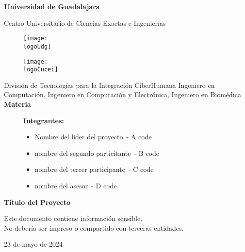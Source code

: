 \documentclass[10pt,twocolumn,letterpaper]{article}
\date{}
\title{\fontsize{24}{28.8}\selectfont \theTitle}
\author{\theAuthor}
\author{\bAuthor}
\affil{\small
	\textit{CENTRO UNIVERSITARIO DE CIENCIAS}\\
	\textit{EXACTAS E INGENIERÍAS, (CUCEI, UDG)}
}
\affil{
	\fontfamily{pcr}\selectfont
	\theAuthorMail\\
	\fontfamily{pcr}\selectfont
	\cAuthorMail\\
	\fontfamily{pcr}\selectfont
	\bAuthorMail\\
	\fontfamily{pcr}\selectfont
	\dAuthorMail
	\vspace*{-8pt}
}
\newcommand{\logoUdg}{logo-udg.jpg}
\newcommand{\logoCucei}{logo-cucei.jpg}
\newcommand{\universidad}{Universidad de Guadalajara}
\newcommand{\cede}{Centro Universitario de Ciencias Exactas e Ingenierías}
\newcommand{\materia}{Materia}
\newcommand{\division}{División de Tecnologías para la Integración CiberHumana}
\newcommand{\theTitle}{Título del Proyecto}
\newcommand{\startDate}{23 de mayo de 2024}
\newcommand{\theAuthor}{Nombre del líder del proyecto}
\newcommand{\bAuthor}{nombre del segundo particitante}
\newcommand{\cAuthor}{nombre del tercer participante}
\newcommand{\dAuthor}{nombre del asesor}
\newcommand{\theAuthorCode}{A code}
\newcommand{\bAuthorCode}{B code}
\newcommand{\cAuthorCode}{C code}
\newcommand{\dAuthorCode}{D code}
\newcommand{\aTitutlo}{Ingeniero en Computación}
\newcommand{\btitulo}{Ingeniero en Computación y Electrónica}
\newcommand{\cTitulo}{Ingeniero en Biomédica}
\begin{document}
\begin{titlepage}
	\centering
	{\huge\textbf{\universidad}}\par\vspace{0.6cm}
	{\LARGE{\cede}}\vfill
	
	\begin{figure}[h]
		\begin{minipage}[t]{0.45\textwidth}
			\centering
			\texttt{[image: \\logoUdg]}
		\end{minipage}
		\hfill
		\begin{minipage}[t]{0.45\textwidth}
			\centering
			\texttt{[image: \\logoCucei]}
		\end{minipage}
	\end{figure}\vfill
	
	\Large{
		\division\vfill
		\aTitutlo, \btitulo, \cTitulo\vfill
		\textbf{\materia}\vfill
	}

	\begin{figure}[h]
		\centering
		\begin{minipage}[t]{0.75\textwidth}
			{\Large
				\textbf{Integrantes:}
				\begin{itemize}
					\item \theAuthor\ - \theAuthorCode
					\item \bAuthor\ - \bAuthorCode
					\item \cAuthor\ - \cAuthorCode
					\item \dAuthor\ - \dAuthorCode
				\end{itemize}
			}
		\end{minipage}
	\end{figure}\vfill

	{\LARGE{\textbf{\theTitle}}}\vfill
	
	\begin{tcolorbox}[colback=red!5!white, colframe=red!75!black]
		\centering
		Este documento contiene información sensible.\\
		No debería ser impreso o compartido con terceras entidades.
	\end{tcolorbox}\vfill

	{\large \startDate}\par
\end{titlepage}

\maketitle
\end{document}
